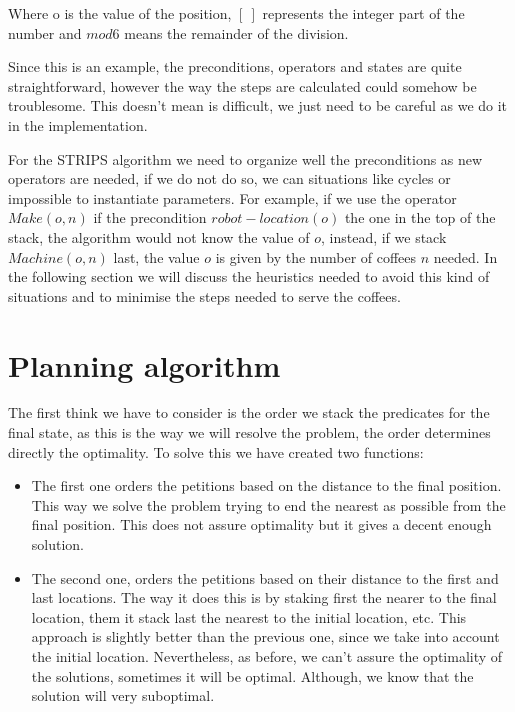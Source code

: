 \documentclass[12pt,a4paper,oneside]{article}
\numberwithin{equation}{section}
\numberwithin{equation}{section}
\theoremstyle{definition}
\begin{document}
Where o is the value of the position, $[ \ ]$ represents the integer part of the number and  $mod6$ means the remainder of the division.

Since this is an example, the preconditions, operators and states are quite straightforward, however the way the steps are calculated could somehow be troublesome. This doesn't mean is difficult, we just need to be careful as we do it in the implementation.

For the STRIPS algorithm we need to organize well the preconditions as new operators are needed, if we do not do so, we can situations like cycles or impossible to instantiate parameters. For example, if we use the operator $Make(o,n)$ if the precondition $robot-location(o)$ the one in the top of the stack, the algorithm would not know the value of $o$, instead, if we stack $Machine(o,n)$ last, the value $o$ is given by the number of coffees $n$ needed. In the following section we will discuss the heuristics needed to avoid this kind of situations and to minimise the steps needed to serve the coffees.


\section{Planning algorithm}

The first think we have to consider is the order we stack the predicates for the final state, as this is the way we  will resolve the problem, the order determines directly the optimality. To solve this we have created two functions:
\begin{itemize}
	\item The first one orders the petitions based on the distance to the final position. This way we solve the problem trying to end the nearest as possible from the final position. This does not assure optimality but it gives a decent enough solution.
	
	\item The second one, orders the petitions based on their distance to the first and last locations. The way it does this is by staking first the nearer to the final location, them it stack last the nearest to the initial location, etc. This approach is slightly better than the previous one, since we take into account the initial location. Nevertheless, as before, we can't assure the optimality of the solutions, sometimes it will be optimal. Although, we know that the solution will very suboptimal.
	
\end{itemize}
\end{document}
